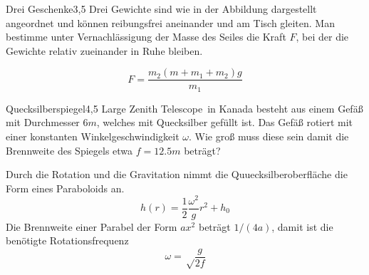 



\begin{problem}{Drei Geschenke}{3,5}
Drei Gewichte sind wie in der Abbildung dargestellt angeordnet und können reibungsfrei aneinander und am Tisch gleiten. Man bestimme unter Vernachlässigung der Masse des Seiles die Kraft $F$, bei der die Gewichte relativ zueinander in Ruhe bleiben.

\begin{solution}
\[
F = \frac{m_2 (m+m_1+m_2) g}{m_1}
\]
\end{solution}
\end{problem}

\begin{problem}{Quecksilberspiegel}{4,5}
\glqq Large Zenith Telescope\grqq\ in Kanada besteht aus einem Gefäß mit Durchmesser $6 \unit{m}$, welches mit Quecksilber gefüllt ist. Das Gefäß rotiert mit einer konstanten Winkelgeschwindigkeit $\omega$. Wie groß muss diese sein damit die Brennweite des Spiegels etwa $f=12.5 \unit{m}$ beträgt?

\begin{solution}
Durch die Rotation und die Gravitation nimmt die Quuecksilberoberfläche die Form eines Paraboloids an.
\[
h(r) = \frac12 \frac{\omega^2}{g} r^2 + h_0
\]
Die Brennweite einer Parabel der Form $ax^2$ beträgt $1/(4a)$, damit ist die benötigte Rotationsfrequenz
\[
\omega = \sqrt\frac{g}{2 f}
\]
\end{solution}

\end{problem}

